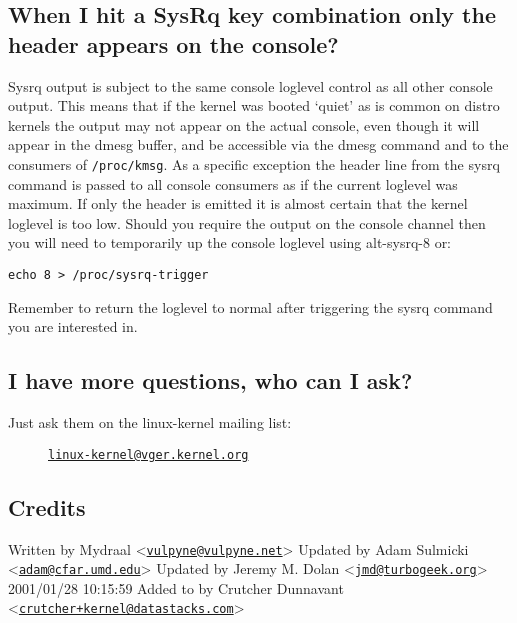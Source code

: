 \subsection{When I hit a SysRq key combination only the header appears
on the
console?}\label{when-i-hit-a-sysrq-key-combination-only-the-header-appears-on-the-console}

Sysrq output is subject to the same console loglevel control as all
other console output. This means that if the kernel was booted `quiet'
as is common on distro kernels the output may not appear on the actual
console, even though it will appear in the dmesg buffer, and be
accessible via the dmesg command and to the consumers of
\texttt{/proc/kmsg}. As a specific exception the header line from the
sysrq command is passed to all console consumers as if the current
loglevel was maximum. If only the header is emitted it is almost certain
that the kernel loglevel is too low. Should you require the output on
the console channel then you will need to temporarily up the console
loglevel using alt-sysrq-8 or:

\begin{verbatim}
echo 8 > /proc/sysrq-trigger
\end{verbatim}

Remember to return the loglevel to normal after triggering the sysrq
command you are interested in.

\subsection{I have more questions, who can I
ask?}\label{i-have-more-questions-who-can-i-ask}

\begin{description}
\item[Just ask them on the linux-kernel mailing list:]
\href{mailto:linux-kernel@vger.kernel.org}{\nolinkurl{linux-kernel@vger.kernel.org}}
\end{description}

\subsection{Credits}\label{credits}

Written by Mydraal
\textless{}\href{mailto:vulpyne@vulpyne.net}{\nolinkurl{vulpyne@vulpyne.net}}\textgreater{}
Updated by Adam Sulmicki
\textless{}\href{mailto:adam@cfar.umd.edu}{\nolinkurl{adam@cfar.umd.edu}}\textgreater{}
Updated by Jeremy M. Dolan
\textless{}\href{mailto:jmd@turbogeek.org}{\nolinkurl{jmd@turbogeek.org}}\textgreater{}
2001/01/28 10:15:59 Added to by Crutcher Dunnavant
\textless{}\href{mailto:crutcher+kernel@datastacks.com}{\nolinkurl{crutcher+kernel@datastacks.com}}\textgreater{}
